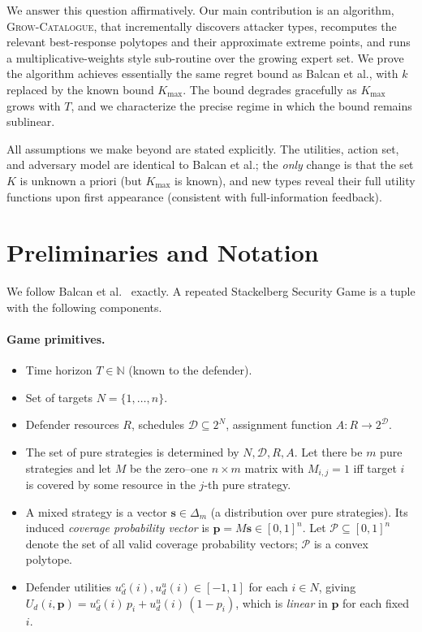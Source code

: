 \documentclass[11pt]{article}
\newcommand{\pvec}{\mathbf{p}}
\newcommand{\svec}{\mathbf{s}}
\newcommand{\cP}{\mathcal{P}}
\newcommand{\cD}{\mathcal{D}}
\newcommand{\NN}{\mathbb{N}}
\newcommand{\Kmax}{K_{\max}}
\begin{document}
We answer this question affirmatively. Our main contribution is an algorithm, \textsc{Grow-Catalogue}, that incrementally discovers attacker types, recomputes the relevant best-response polytopes and their approximate extreme points, and runs a multiplicative-weights style sub-routine over the growing expert set. We prove the algorithm achieves essentially the same regret bound as Balcan et al., with $k$ replaced by the known bound $\Kmax$. The bound degrades gracefully as $\Kmax$ grows with $T$, and we characterize the precise regime in which the bound remains sublinear.

All assumptions we make beyond \cite{balcan2015} are stated explicitly. The utilities, action set, and adversary model are identical to Balcan et al.; the \emph{only} change is that the set $K$ is unknown a priori (but $\Kmax$ is known), and new types reveal their full utility functions upon first appearance (consistent with full-information feedback).

\section{Preliminaries and Notation}
\label{sec:prelim}

We follow Balcan et al.\ \cite[Section~2]{balcan2015} exactly. A repeated Stackelberg Security Game is a tuple with the following components.

\paragraph{Game primitives.}
\begin{itemize}[leftmargin=*]
  \item Time horizon $T \in \NN$ (known to the defender).
  \item Set of targets $N = \{1,\dots,n\}$.
  \item Defender resources $R$, schedules $\cD \subseteq 2^N$, assignment function $A: R \to 2^{\cD}$.
  \item The set of pure strategies is determined by $N, \cD, R, A$. Let there be $m$ pure strategies and let $M$ be the zero--one $n\times m$ matrix with $M_{i,j}=1$ iff target $i$ is covered by some resource in the $j$-th pure strategy.
  \item A mixed strategy is a vector $\svec \in \Delta_m$ (a distribution over pure strategies). Its induced \emph{coverage probability vector} is $\pvec = M\svec \in [0,1]^n$. Let $\cP \subseteq [0,1]^n$ denote the set of all valid coverage probability vectors; $\cP$ is a convex polytope.
  \item Defender utilities $u_d^c(i), u_d^u(i) \in [-1,1]$ for each $i \in N$, giving
  $U_d(i,\pvec) = u_d^c(i)\,p_i + u_d^u(i)\,(1-p_i)$, which is \emph{linear} in $\pvec$ for each fixed $i$.
\end{itemize}
\end{document}
